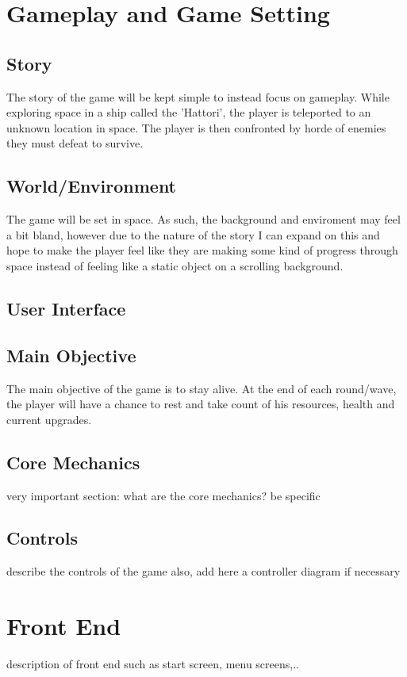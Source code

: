 \documentclass[a4paper]{scrreprt}
\begin{document}
\chapter{Gameplay and Game Setting}
\section{Story}
The story of the game will be kept simple to instead focus on gameplay. While exploring space in a ship called the 'Hattori', the player is teleported to an unknown location in space. The player is then confronted by horde of enemies they must defeat to survive.

\section{World/Environment}
The game will be set in space. As such, the background and enviroment may feel a bit bland, however due to the nature of the story I can expand on this and hope to make the player feel like they are making some kind of progress through space instead of feeling like a static object on a scrolling background. 

\section{User Interface}


\section{Main Objective}
The main objective of the game is to stay alive. At the end of each round/wave, the player will have a chance to rest and take count of his resources, health and current upgrades.

\section{Core Mechanics}
very important section: what are the core mechanics? be specific

\section{Controls}
describe the controls of the game 
also, add here a controller diagram if necessary 



\chapter{Front End}
description of front end such as start screen, menu screens,..  
\end{document}
